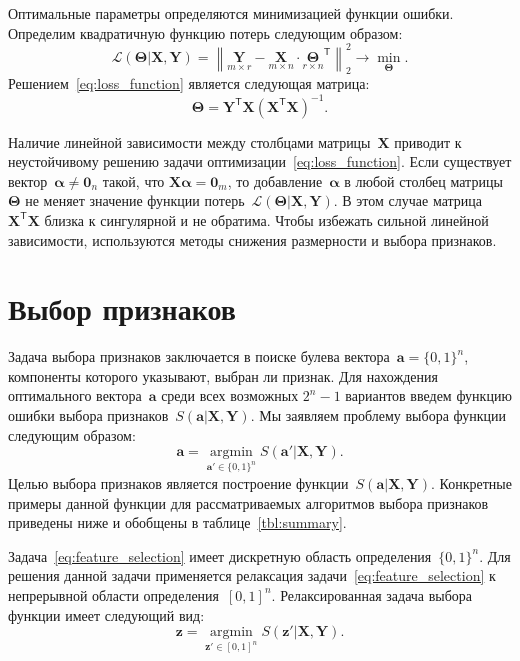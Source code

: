 \documentclass[preprint,12pt]{elsarticle}
\theoremstyle{definition}
\newcommand{\ba}{\mathbf{a}}
\newcommand{\bz}{\mathbf{z}}
\newcommand{\bY}{\mathbf{Y}}
\newcommand{\bX}{\mathbf{X}}
\newcommand{\T}{\mathsf{T}}
\newcommand{\bTheta}{\boldsymbol{\Theta}}
\newcommand{\bZero}{\boldsymbol{0}}
\newcommand{\argmin}{\mathop{\arg \min}\limits}
\begin{document}
Оптимальные параметры определяются минимизацией функции ошибки.
Определим квадратичную функцию потерь следующим образом:
\begin{equation}
\mathcal{L}(\bTheta | \bX, \bY) = {\left\| \underset{m \times r}{\mathbf{Y}}  - \underset{m \times n}{\bX} \cdot \underset{r \times n}{\bTheta}^{\T} \right\| }_2^2 \rightarrow\min_{\bTheta}.
\label{eq:loss_function}
\end{equation}
Решением~\eqref{eq:loss_function} является следующая матрица:
\begin{equation*}
\bTheta = \bY^{\T} \bX (\bX^{\T} \bX)^{-1}.
\end{equation*}

Наличие линейной зависимости между столбцами матрицы~$\bX$ приводит к неустойчивому решению задачи оптимизации~\eqref{eq:loss_function}.
Если существует вектор~$\boldsymbol{\alpha} \neq \bZero_n$ такой, что $\bX \boldsymbol{\alpha}= \bZero_m$, то добавление~$\boldsymbol{\alpha}$ в любой столбец матрицы~$\bTheta$ не меняет значение функции потерь~$\mathcal{L}(\bTheta | \bX, \bY)$.
В этом случае матрица~$\bX^{\T} \bX$ близка к сингулярной и не обратима.
Чтобы избежать сильной линейной зависимости, используются методы снижения размерности и выбора признаков.

\section{Выбор признаков}

Задача выбора признаков заключается в поиске булева вектора~$\ba = \{0, 1\}^n$, компоненты которого указывают, выбран ли признак. 
Для нахождения оптимального вектора~$\ba$ среди всех возможных $2^n - 1$ вариантов введем функцию ошибки выбора признаков~$S(\ba | \bX, \bY)$. 
Мы заявляем проблему выбора функции следующим образом:
\begin{equation}
\ba = \argmin_{\ba' \in \{0, 1\}^n} S(\ba' | \bX, \bY).
\label{eq:feature_selection}
\end{equation}
Целью выбора признаков является построение функции~$S (\ba | \bX, \bY)$. Конкретные примеры данной функции для рассматриваемых алгоритмов выбора признаков приведены ниже и обобщены в таблице~\ref{tbl:summary}.

Задача~\eqref{eq:feature_selection} имеет дискретную область определения~$\{0, 1\}^n$. Для решения данной задачи применяется релаксация задачи~\eqref{eq:feature_selection} к непрерывной области определения~$[0, 1]^n$. Релаксированная задача выбора функции имеет следующий вид:
\begin{equation}
\bz = \argmin_{\bz' \in [0, 1]^n} S(\bz' | \bX, \bY).
\label{eq:relaxed_feature_selection}
\end{equation}
\end{document}
